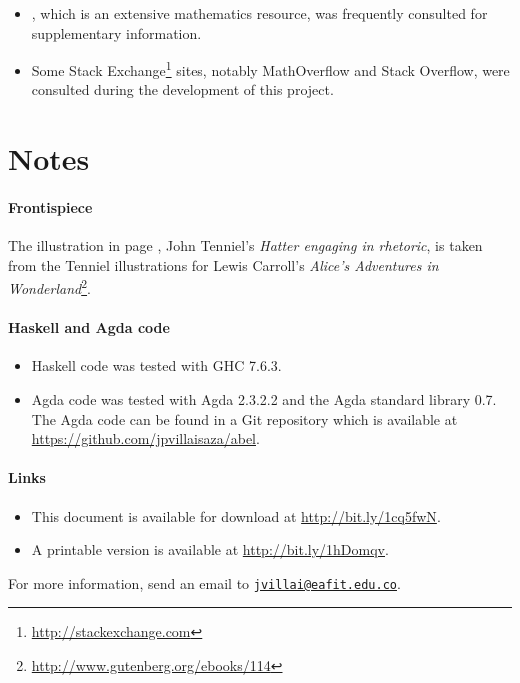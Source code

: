 \begin{itemize}
\item
  \parencite{weisstein-mathworld}, which is an extensive mathematics
  resource, was frequently consulted for supplementary information.

\item
  Some Stack Exchange\footnote{\url{http://stackexchange.com}} sites,
  notably MathOverflow and Stack Overflow, were consulted during the
  development of this project.

\end{itemize}

\section*{Notes}
\label{sec:introduction-notes}

\paragraph{Frontispiece}

The illustration in page \pageref{fig:hatter}, John Tenniel's
\emph{Hatter engaging in rhetoric}, is taken from the Tenniel
illustrations for Lewis Carroll's \emph{Alice's Adventures in
  Wonderland}\footnote{\url{http://www.gutenberg.org/ebooks/114}}.

\paragraph{Haskell and Agda code}

\begin{itemize}
\item
  Haskell code was tested with GHC 7.6.3.

\item
  Agda code was tested with Agda 2.3.2.2 and the Agda standard library
  0.7. The Agda code can be found in a Git repository which is
  available at \url{https://github.com/jpvillaisaza/abel}.

\end{itemize}

\paragraph{Links}

\begin{itemize}
\item
  This document is available for download at
  \url{http://bit.ly/1cq5fwN}.

\item
  A printable version is available at \url{http://bit.ly/1hDomqv}.

\end{itemize}
For more information, send an email to
\href{mailto:jvillai@eafit.edu.co}{\nolinkurl{jvillai@eafit.edu.co}}.

\clearemptydoublepage
